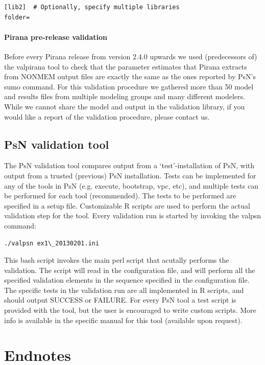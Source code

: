 {{{{\begin{lstlisting}
[lib2]  # Optionally, specify multiple libraries
folder=
\end{lstlisting}

\subsubsection*{Pirana pre-release validation}
Before every Pirana release from version 2.4.0 upwards we used
(predecessors of) the valpirana tool to check that the parameter
estimates that Pirana extracts from NONMEM output files are exactly
the same as the ones reported by PsN's sumo command. For this
validation procedure we gathered more than 50 model and results files
from multiple modeling groups and many different modelers. While we cannot share the
model and output in the validation library, if you
would like a report of the validation procedure, please contact us.

\section{PsN validation tool}
The PsN validation tool compares output from a `test'-installation of
PsN, with output from a trusted (previous) PsN installation. Tests can
be implemented for any of the tools in PsN (e.g. execute, bootstrap,
vpc, etc), and multiple tests can be performed for each tool
(recommended). The tests to be performed are specified in a setup file. Customizable
R scripts are used to perform the actual validation step for the tool. Every validation run is started by invoking the valpsn command:

\begin{lstlisting}
./valpsn ex1\_20130201.ini
\end{lstlisting}

\noindent This bash script invokes the main perl script that acutally performs the
validation. The script will read in the configuration file, and will
perform all the specified validation elements in the sequence
specified in the configuration file. The specific tests in the
validation run are all implemented in R scripts, and should output
SUCCESS or FAILURE. For every PsN tool a test script is provided with
the tool, but the user is encouraged to write custom scripts.
More info is available in the specific manual for this tool (available upon request).

\chapter{Endnotes}
}}}}
